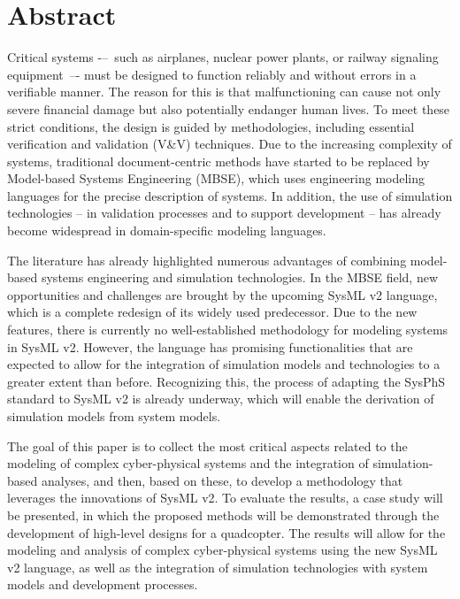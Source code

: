 \vfill
\selectenglish


\chapter*{Abstract}

Critical systems -–~such as airplanes, nuclear power plants, or railway signaling equipment~–- must be designed to function reliably and without errors in a verifiable manner. The reason for this is that malfunctioning can cause not only severe financial damage but also potentially endanger human lives. To meet these strict conditions, the design is guided by methodologies, including essential verification and validation (V\&V) techniques. Due to the increasing complexity of systems, traditional document-centric methods have started to be replaced by Model-based Systems Engineering (MBSE), which uses engineering modeling languages for the precise description of systems. In addition, the use of simulation technologies – in validation processes and to support development – has already become widespread in domain-specific modeling languages.

The literature has already highlighted numerous advantages of combining model-based systems engineering and simulation technologies. In the MBSE field, new opportunities and challenges are brought by the upcoming SysML v2 language, which is a complete redesign of its widely used predecessor. Due to the new features, there is currently no well-established methodology for modeling systems in SysML v2. However, the language has promising functionalities that are expected to allow for the integration of simulation models and technologies to a greater extent than before. Recognizing this, the process of adapting the SysPhS standard to SysML v2 is already underway, which will enable the derivation of simulation models from system models.

The goal of this paper is to collect the most critical aspects related to the modeling of complex cyber-physical systems and the integration of simulation-based analyses, and then, based on these, to develop a methodology that leverages the innovations of SysML v2. To evaluate the results, a case study will be presented, in which the proposed methods will be demonstrated through the development of high-level designs for a quadcopter. The results will allow for the modeling and analysis of complex cyber-physical systems using the new SysML v2 language, as well as the integration of simulation technologies with system models and development processes.

\vfill
\cleardoublepage

\selectthesislanguage

\setcounter{romanPage}{\value{page}}
